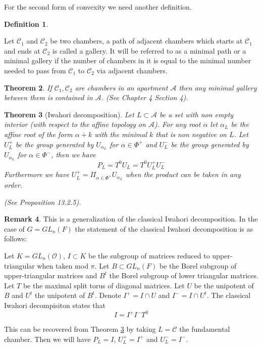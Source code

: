 \documentclass[12pt]{article}
\newcommand{\A}{\mathcal{A}}
\newcommand{\C}{\mathcal{C}}
\newcommand{\s}{\mathcal{O}}
\newcommand{\<}{\langle}
\renewcommand{\>}{\rangle}
\theoremstyle{plain}
\newtheorem{theorem}{Theorem}[section] %
\theoremstyle{definition}
\newtheorem{Remark}[theorem]{Remark}
\newtheorem{defn}[theorem]{Definition} %
\begin{document}
For the second form of convexity we need another definition.

\begin{defn}\label{2.14}

    Let $\C_1$ and $\C_2$ be two chambers, a path of adjacent chambers which starts at $\C_1$ and ends at $\C_2$ is called a gallery. It will be referred to as a minimal path or a minimal gallery if the number of chambers in it is equal to the minimal number needed to pass from $\C_1$ to $\C_2$ via adjacent chambers.
\end{defn}
    
    \begin{theorem}\label{2.15}
     If $\C_1,\C_2$ are chambers in an apartment $\A$ then any minimal gallery between them is contained in $\A$. (See \cite{Brown1989} Chapter 4 Section 4).
    \end{theorem}


\begin{theorem}[Iwahori decomposition]\label{2.16}
Let $L\subset \A$ be a set with non empty interior (with respect to the affine topology on $\A$). For any root $\alpha$ let $\alpha_L$ be the affine root of the form $\alpha+k$ with the minimal $k$ that is non negative on $L$. Let $U_L^+$ be the group generated by $U_{\alpha_L}$ for $\alpha\in\Phi^+$ and $U_L^-$ be the group generated by $U_{\alpha_L}$ for $\alpha\in\Phi^-$, then we have
\begin{equation}
    P_L=T^0U_L=T^0U_L^+U_L^-
\end{equation}
  Furthermore we have  $U_L^+=\Pi_{\alpha\in\Phi^+}U_{\alpha_L}$ when the product can be taken in any order.

(See \cite{BruhatTitsTA} Proposition 13.2.5).
\end{theorem}

\begin{Remark}
This is a generalization of the classical Iwahori decomposition. In the case of $G=GL_n(F)$ the statement of the classical Iwahori decomposition is as follows:

Let $K=GL_n(\s)$, $I\subset K$ be the subgroup of matrices reduced to upper-triangular when taken mod $\pi$. Let $B\subset GL_n(F)$ be the Borel subgroup of upper-triangular matrices and $B^t$ the Borel subgroup of lower triangular matrices.  Let $T$ be the maximal split torus of diagonal matrices. Let $U$ be the unipotent of $B$ and $U^t$ the unipotent of $B^t$. Denote $I^+=I\cap U$ and $I^-=I\cap U^t$. The classical Iwahori decompisiton states that 
\begin{equation*}
    I=I^+I^-T^0
\end{equation*}

This can be recovered from Theorem \ref{2.16} by taking $L=\C$ the fundamental chamber. Then we will have $P_L=I$, $U^+_L=I^+$ and $U^-_L=I^-$.
\end{Remark} 
\end{document}
